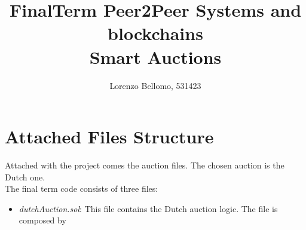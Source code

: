 \documentclass[11pt, a4paper]{report}
\title{
	FinalTerm Peer2Peer Systems and blockchains \\
	\large Smart Auctions}
\author{Lorenzo Bellomo, 531423}
\date{}
\begin{document}
	\maketitle
	
\section*{Attached Files Structure}

	Attached with the project comes the auction files. The chosen auction is the Dutch one. \\
	The final term code consists of three files:
	\begin{itemize}
		\item \emph{dutchAuction.sol}: This file contains the Dutch auction logic. The file is composed by 
	\end{itemize}
	
	
\end{document}
